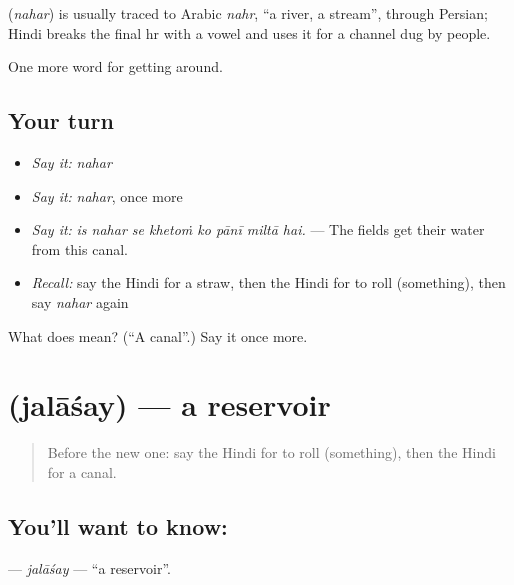\begin{cousinweb}
\textbf{} (\emph{nahar}) is usually traced to Arabic \emph{nahr}, \textquotedblleft{}a river, a stream\textquotedblright{}, through Persian; Hindi breaks the final hr with a vowel and uses it for a channel dug by people.
\end{cousinweb}

\begin{grammarlens}[title={What you've built}]
One more word for getting around.
\end{grammarlens}

\subsection*{Your turn}
\begin{itemize}
\raggedright
  \item \emph{Say it:} \emph{nahar}
  \item \emph{Say it:} \emph{nahar}, once more
  \item \emph{Say it:} \emph{is nahar se khetoṁ ko pānī miltā hai.} — The fields get their water from this canal.
  \item \emph{Recall:} say the Hindi for a straw, then the Hindi for to roll (something), then say \emph{nahar} again
\end{itemize}

\begin{tcolorbox}[breakable,colback=teal!4,colframe=teal!35!black,title={Before you move on}]
What does  mean? (\textquotedblleft{}A canal\textquotedblright{}.) Say it once more.
\end{tcolorbox}
\section[\texorpdfstring{\hi{जलाशय} (jalāśay)}{जलाशय (jalāśay)}]{ (jalāśay) — a reservoir}

\label{lesson:HI-C443-jalasay}



\begin{quote}
Before the new one: say the Hindi for to roll (something), then the Hindi for a canal.
\end{quote}

\subsection*{You'll want to know: }
\textbf{} — \emph{jalāśay} — \textquotedblleft{}a reservoir\textquotedblright{}.

